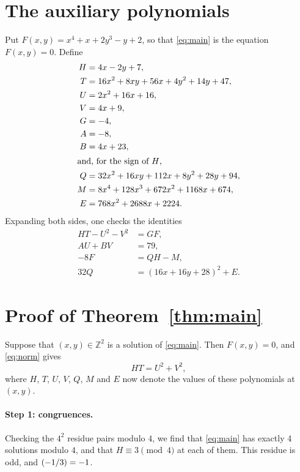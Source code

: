 \documentclass[11pt]{article}
\newcommand{\Z}{\mathbb{Z}}
\newcommand{\leg}[2]{\mathchoice{\biggl(\dfrac{#1}{#2}\biggr)}{(#1/#2)}{(#1/#2)}{(#1/#2)}}
\begin{document}
\section{The auxiliary polynomials}

Put $F(x,y)=x^{4}+x+2y^{3}-y+2$, so that \eqref{eq:main} is the equation $F(x,y)=0$. Define
\begin{align*}
H&=4x-2y+7,\\
T&=16x^{2}+8xy+56x+4y^{2}+14y+47,\\
U&=2x^{2}+16x+16,\\
V&=4x+9,\\
G&=-4,\\
A&=-8,\\
B&=4x+23,\\
\intertext{and, for the sign of $H$,}
Q&=32x^{2}+16xy+112x+8y^{2}+28y+94,\\
M&=8x^{4}+128x^{3}+672x^{2}+1168x+674,\\
E&=768x^{2}+2688x+2224.
\end{align*}
Expanding both sides, one checks the identities
\begin{align}
HT-U^2-V^2&=GF,\label{eq:norm}\\
AU+BV&=79,\label{eq:bezout}\\
-8F&=QH-M,\label{eq:sign}\\
32Q&=(16x+16y+28)^2+E.\label{eq:sign2}
\end{align}

\section{Proof of Theorem~\ref{thm:main}}

Suppose that $(x,y)\in\Z^2$ is a solution of \eqref{eq:main}. Then $F(x,y)=0$, and \eqref{eq:norm} gives
\begin{equation}\label{eq:HT}
HT=U^2+V^2,
\end{equation}
where $H$, $T$, $U$, $V$, $Q$, $M$ and $E$ now denote the values of these polynomials at $(x,y)$.

\paragraph{Step 1: congruences.} Checking the $4^2$ residue pairs modulo $4$, we find that \eqref{eq:main} has exactly 4 solutions modulo $4$, and that $H\equiv3\pmod{4}$ at each of them. This residue is odd, and $\leg{-1}{3}=-1$.
\end{document}
